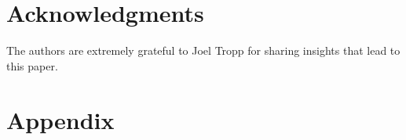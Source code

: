 \documentclass[conference]{IEEEtran}
\newcommand{\bOmega}{\bm{\Omega}}
\begin{document}

\section{Acknowledgments}

The authors are extremely grateful to Joel Tropp for sharing insights that lead to this paper. 

\section{Appendix}
\end{document}
